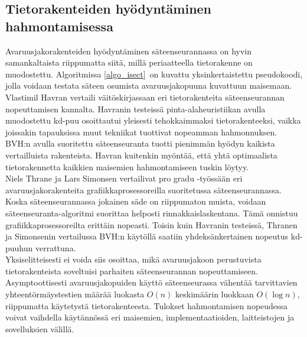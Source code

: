 \documentclass[a4paper, 12pt, titlepage]{article}
\begin{document}


\subsection{Tietorakenteiden hyödyntäminen hahmontamisessa}

Avaruusjakorakenteiden hyödyntäminen säteenseurannassa on hyvin samankaltaista riippumatta siitä, millä periaatteella tietorakenne on muodostettu. Algoritmissa \ref{algo_isect} on kuvattu yksinkertaistettu pseudokoodi, jolla voidaan testata säteen osumista avaruusjakopuuna kuvattuun maisemaan.\\ 



Vlastimil Havran vertaili väitöskirjassaan eri tietorakenteita säteenseurannan nopeuttamisen kannalta. Havranin testeissä pinta-alaheuristiikan avulla muodostettu kd-puu osoittautui yleisesti tehokkaimmaksi tietorakenteeksi, vaikka joissakin tapauksissa muut tekniikat tuottivat nopeamman hahmonnuksen. BVH:n avulla suoritettu säteenseuranta tuotti pienimmän hyödyn kaikista vertailluista rakenteista. Havran kuitenkin myöntää, että yhtä optimaalista tietorakennetta kaikkien maisemien hahmontamiseen tuskin löytyy. \citep[.]{havran}\\

Niels Thrane ja Lars Simonsen vertailivat pro gradu -työssään eri avaruusjakorakenteita grafiikkaprosessoreilla suoritetussa säteenseurannassa. Koska säteenseurannassa jokainen säde on riippumaton muista, voidaan säteenseuranta-algoritmi suorittaa helposti rinnakkaislaskentana. Tämä onnistuu grafiikkaprosessoreilta erittäin nopeasti. Toisin kuin Havranin testeissä, Thranen ja Simonsenin vertailussa BVH:n käytöllä saatiin yhdeksänkertainen nopeutus kd-puuhun verrattuna. \citep[.]{thrane}\\  

Yksiselitteisesti ei voida siis osoittaa, mikä avaruusjakoon perustuvista tietorakenteista soveltuisi parhaiten säteenseurannan nopeuttamiseen. Asymptoottisesti avaruusjakopuiden käyttö säteenseurassa vähentää tarvittavien yhteentörmäystestien määrää luokasta $O(n)$ keskimäärin luokkaan $O(\log n)$, riippumatta käytetystä tietorakenteesta. Tulokset hahmontamisen nopeudessa voivat vaihdella käytännössä eri maisemien, implementaatioiden, laitteistojen ja sovelluksien välillä. \citep[.]{wald04} \\
\end{document}
